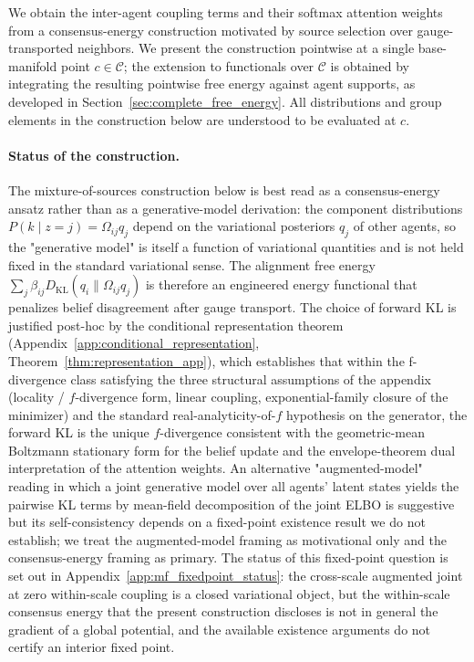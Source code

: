 \documentclass[11pt]{article}
\begin{document}
We obtain the inter-agent coupling terms and their softmax attention weights from a consensus-energy construction motivated by source selection over gauge-transported neighbors. We present the construction pointwise at a single base-manifold point $c \in \mathcal{C}$; the extension to functionals over $\mathcal{C}$ is obtained by integrating the resulting pointwise free energy against agent supports, as developed in Section~\ref{sec:complete_free_energy}. All distributions and group elements in the construction below are understood to be evaluated at $c$.

\paragraph{Status of the construction.} The mixture-of-sources construction below is best read as a consensus-energy ansatz rather than as a generative-model derivation: the component distributions $P(k \mid z{=}j) = \Omega_{ij}q_j$ depend on the variational posteriors $q_j$ of other agents, so the "generative model" is itself a function of variational quantities and is not held fixed in the standard variational sense. The alignment free energy $\sum_j \beta_{ij} D_{\mathrm{KL}}(q_i \| \Omega_{ij}q_j)$ is therefore an engineered energy functional that penalizes belief disagreement after gauge transport. The choice of forward KL is justified post-hoc by the conditional representation theorem (Appendix~\ref{app:conditional_representation}, Theorem~\ref{thm:representation_app}), which establishes that within the f-divergence class satisfying the three structural assumptions of the appendix (locality / $f$-divergence form, linear coupling, exponential-family closure of the minimizer) and the standard real-analyticity-of-$f$ hypothesis on the generator, the forward KL is the unique $f$-divergence consistent with the geometric-mean Boltzmann stationary form for the belief update and the envelope-theorem dual interpretation of the attention weights. An alternative "augmented-model" reading in which a joint generative model over all agents' latent states yields the pairwise KL terms by mean-field decomposition of the joint ELBO is suggestive but its self-consistency depends on a fixed-point existence result we do not establish; we treat the augmented-model framing as motivational only and the consensus-energy framing as primary. The status of this fixed-point question is set out in Appendix~\ref{app:mf_fixedpoint_status}: the cross-scale augmented joint at zero within-scale coupling is a closed variational object, but the within-scale consensus energy that the present construction discloses is not in general the gradient of a global potential, and the available existence arguments do not certify an interior fixed point.
\end{document}
